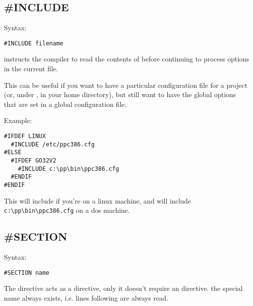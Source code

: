 \documentclass{report}
\begin{document}
\subsection{\#INCLUDE}
Syntax:
\begin{verbatim}
#INCLUDE filename
\end{verbatim}
 instructs the compiler to read the contents of
 before continuing to process options in the current file.

This can be useful if you want to have a particular configuration file
for a project (or, under \linux, in your home directory), but still want to
have the global options that are set in a global configuration file.

Example:
\begin{verbatim}
#IFDEF LINUX
  #INCLUDE /etc/ppc386.cfg
#ELSE
  #IFDEF GO32V2
    #INCLUDE c:\pp\bin\ppc386.cfg
  #ENDIF
#ENDIF
\end{verbatim}
This will include  if you're on a linux machine,
and will include \verb+c:\pp\bin\ppc386.cfg+
on a dos machine.

\subsection{\#SECTION}
Syntax:
\begin{verbatim}
#SECTION name
\end{verbatim}
The  directive acts as a  directive, only
it doesn't require an  directive. the special name 
always exists, i.e. lines following  are always read.

\end{document}
